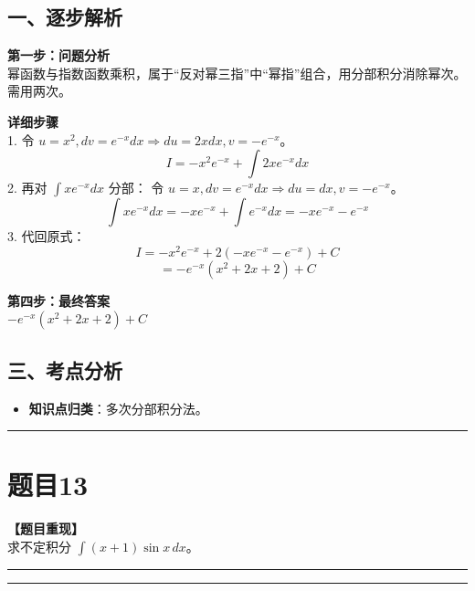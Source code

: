 \documentclass[12pt, a4paper]{ctexart}
\newcommand{\TopSeparator}{
    \par\noindent\rule{\textwidth}{1.5pt}\vspace{0.5em} %
}
\newcommand{\AnalysisSeparator}{
    \par\noindent\rule{\textwidth}{0.5pt}\vspace{0.2em}\hrule\vspace{0.5em} %
}
\newenvironment{RedAnalysis}{
    \par
    \color{red} %
}{
    \par
    \color{black} %
}
\begin{document}
\begin{RedAnalysis}

\subsection*{一、逐步解析}

\textbf{第一步：问题分析} \\
幂函数与指数函数乘积，属于“反对幂三指”中“幂指”组合，用分部积分消除幂次。需用两次。

\textbf{详细步骤} \\
1. 令 $u=x^2, dv=e^{-x}dx \Rightarrow du=2xdx, v=-e^{-x}$。
   \[ I = -x^2 e^{-x} + \int 2x e^{-x} dx \]
2. 再对 $\int x e^{-x} dx$ 分部：
   令 $u=x, dv=e^{-x}dx \Rightarrow du=dx, v=-e^{-x}$。
   \[ \int x e^{-x} dx = -xe^{-x} + \int e^{-x} dx = -xe^{-x} - e^{-x} \]
3. 代回原式：
   \[ I = -x^2 e^{-x} + 2(-xe^{-x} - e^{-x}) + C \]
   \[ = -e^{-x}(x^2 + 2x + 2) + C \]

\textbf{第四步：最终答案} \\
$ -e^{-x}(x^2 + 2x + 2) + C $

\subsection*{三、考点分析}
\begin{itemize}
    \item \textbf{知识点归类}：多次分部积分法。
\end{itemize}

\end{RedAnalysis}

\vspace{2em}

\TopSeparator
\section*{题目13}

\textbf{【题目重现】} \\
求不定积分 $ \int(x+1)\sin x \, dx $。

\AnalysisSeparator
\end{document}
